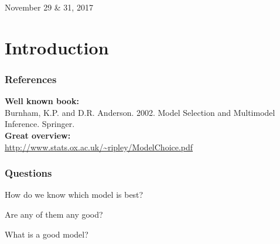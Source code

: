 \documentclass[color=usenames,dvipsnames]{beamer}\usepackage[]{graphicx}\usepackage[]{color}
\begin{document}
\setlength\fboxsep{0pt}



\begin{frame}[plain]
  \LARGE
  \centering \par
  {\color{PineGreen}{Model Selection and %
  Multimodel Inference \par}}
  \vspace{1cm}
  \large
  November 29 \& 31, 2017
\end{frame}


\section{Introduction}



\begin{frame}
  \frametitle{References}
  {\bf Well known book:} \\
  Burnham, K.P. and D.R. Anderson. 2002. Model Selection and
  Multimodel Inference. Springer.\\
  \vspace{0.5cm}
  {\bf Great overview:} \\
  \url{http://www.stats.ox.ac.uk/~ripley/ModelChoice.pdf} \\
\end{frame}



\begin{frame}
  \frametitle{Questions}
  \Large
{How do we know which model is best? \par}
  \pause
  \vspace{0.9cm}
{ Are any of them any good? \par}
  \pause
  \vspace{0.9cm}
{What is a good model? \par}
\end{frame}
\end{document}
